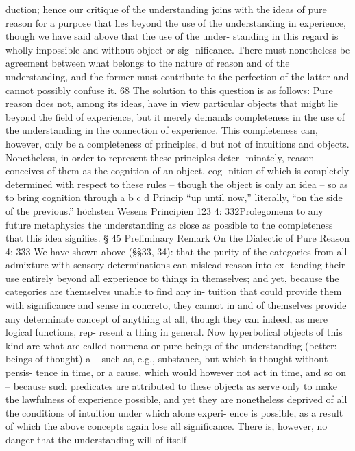 duction; hence our critique of the understanding joins with the ideas of
pure reason for a purpose that lies beyond the use of the understanding
in experience, though we have said above that the use of the under-
standing in this regard is wholly impossible and without object or sig-
niﬁcance. There must nonetheless be agreement between what belongs
to the nature of reason and of the understanding, and the former must
contribute to the perfection of the latter and cannot possibly confuse
it. 68
The solution to this question is as follows: Pure reason does not,
among its ideas, have in view particular objects that might lie beyond
the ﬁeld of experience, but it merely demands completeness in the use of
the understanding in the connection of experience. This completeness
can, however, only be a completeness of principles, d but not of intuitions
and objects. Nonetheless, in order to represent these principles deter-
minately, reason conceives of them as the cognition of an object, cog-
nition of which is completely determined with respect to these rules –
though the object is only an idea – so as to bring cognition through
a
b
c
d
Princip
“up until now,” literally, “on the side of the previous.”
höchsten Wesens
Principien
123
4: 332Prolegomena to any future metaphysics
the understanding as close as possible to the completeness that this idea
signiﬁes.
§ 45
Preliminary Remark
On the Dialectic of Pure Reason
4: 333
We have shown above (§§33, 34): that the purity of the categories from
all admixture with sensory determinations can mislead reason into ex-
tending their use entirely beyond all experience to things in themselves;
and yet, because the categories are themselves unable to ﬁnd any in-
tuition that could provide them with signiﬁcance and sense in concreto,
they cannot in and of themselves provide any determinate concept of
anything at all, though they can indeed, as mere logical functions, rep-
resent a thing in general. Now hyperbolical objects of this kind are what
are called noumena or pure beings of the understanding (better: beings
of thought) a – such as, e.g., substance, but which is thought without persis-
tence in time, or a cause, which would however not act in time, and so on –
because such predicates are attributed to these objects as serve only to
make the lawfulness of experience possible, and yet they are nonetheless
deprived of all the conditions of intuition under which alone experi-
ence is possible, as a result of which the above concepts again lose all
signiﬁcance.
There is, however, no danger that the understanding will of itself
